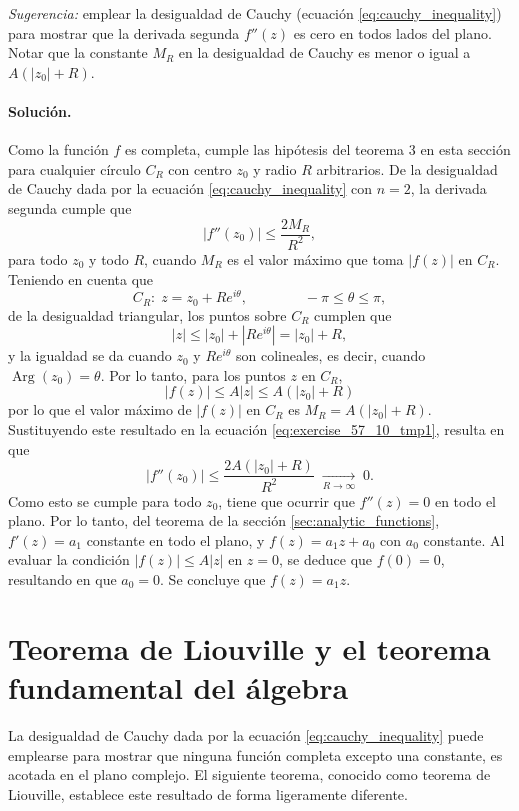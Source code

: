 \documentclass[a4paper]{report}
\DeclareMathOperator{\Arg}{Arg}
\begin{document}
\emph{Sugerencia:} emplear la desigualdad de Cauchy (ecuación \ref{eq:cauchy_inequality}) para mostrar que la derivada segunda \(f''(z)\) es cero en todos lados del plano. Notar que la constante \(M_R\) en la desigualdad de Cauchy es menor o igual a \(A(|z_0|+R)\).

\paragraph{Solución.} Como la función \(f\) es completa, cumple las hipótesis del teorema 3 en esta sección para cualquier círculo \(C_R\) con centro \(z_0\) y radio \(R\) arbitrarios. De la desigualdad de Cauchy dada por la ecuación \ref{eq:cauchy_inequality} con \(n=2\), la derivada segunda cumple que 
\begin{equation}\label{eq:exercise_57_10_tmp1}
 |f''(z_0)|\leq\frac{2M_R}{R^2}, 
\end{equation}
para todo \(z_0\) y todo \(R\), cuando \(M_R\) es el valor máximo que toma \(|f(z)|\) en \(C_R\). Teniendo en cuenta que 
\[
 C_R:\;z=z_0+Re^{i\theta},
 \qquad\qquad 
 -\pi\leq\theta\leq\pi,
\]
de la desigualdad triangular, los puntos sobre \(C_R\) cumplen que 
\[
 |z|\leq|z_0|+|Re^{i\theta}|=|z_0|+R,
\]
y la igualdad se da cuando \(z_0\) y \(Re^{i\theta}\) son colineales, es decir, cuando \(\Arg(z_0)=\theta\). Por lo tanto, para los puntos \(z\)  en \(C_R\),
\[
 |f(z)|\leq A|z|\leq A(|z_0|+R)
\]
por lo que el valor máximo de \(|f(z)|\) en \(C_R\) es \(M_R=A(|z_0|+R)\). Sustituyendo este resultado en la ecuación \ref{eq:exercise_57_10_tmp1}, resulta en que 
\[
 |f''(z_0)|\leq\frac{2A(|z_0|+R)}{R^2}\;\xrightarrow[R\to\infty]{}\;0.
\]
Como esto se cumple para todo \(z_0\), tiene que ocurrir que \(f''(z)=0\) en todo el plano. Por lo tanto, del teorema de la sección \ref{sec:analytic_functions}, \(f'(z)=a_1\) constante en todo el plano, y \(f(z)=a_1z+a_0\) con \(a_0\) constante. Al evaluar la condición \(|f(z)|\leq A|z|\) en \(z=0\), se deduce que \(f(0)=0\), resultando en que \(a_0=0\). Se concluye que \(f(z)=a_1z\).

\section{Teorema de Liouville y el teorema fundamental del álgebra}\label{sec:liouville_theorem}

La desigualdad de Cauchy dada por la ecuación \ref{eq:cauchy_inequality} puede emplearse para mostrar que ninguna función completa excepto una constante, es acotada en el plano complejo. El siguiente teorema, conocido como teorema de Liouville, establece este resultado de forma ligeramente diferente.
\end{document}
